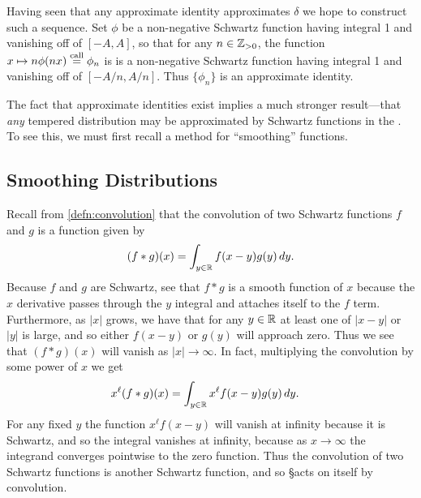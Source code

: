     Having seen that any approximate identity approximates $\delta$ we hope to construct such a sequence.
    Set $\phi$ be a non-negative Schwartz function having integral 1 and vanishing off of $[-A,A]$, so that for any $n\in\mathbb{Z}_{>0}$, the function $x\mapsto n\phi(nx) \overset{\text{call}}{=} \phi_n$ is is a non-negative Schwartz function having integral 1 and vanishing off of $[-A/n,A/n]$.
    Thus $\{\phi_n\}$ is an approximate identity.

    The fact that approximate identities exist implies a much stronger result---that \emph{any} tempered distribution may be approximated by Schwartz functions in the \ws.
    To see this, we must first recall a method for ``smoothing'' functions.

  \subsection{Smoothing Distributions}
    Recall from \cref{defn:convolution} that the convolution of two Schwartz functions $f$ and $g$ is a function given by
    \begin{align*}
      (f*g)(x) = \int_{y\in\mathbb{R}} f(x-y)g(y)\,dy \text{.}
    \end{align*}
    Because $f$ and $g$ are Schwartz, see that $f*g$ is a smooth function of $x$ because the $x$ derivative passes through the $y$ integral and attaches itself to the $f$ term.
    Furthermore, as $|x|$ grows, we have that for any $y\in\mathbb{R}$ at least one of $|x-y|$ or $|y|$ is large, and so either $f(x-y)$ or $g(y)$ will approach zero.
    Thus we see that $(f*g)(x)$ will vanish as $|x|\rightarrow\infty$.
    In fact, multiplying the convolution by some power of $x$ we get
    \begin{align*}
      x^\ell(f*g)(x)
      &= \int_{y\in\mathbb{R}} x^\ell f(x-y)g(y)\,dy \text{.}
    \end{align*}
    For any fixed $y$ the function $x^\ell f(x-y)$ will vanish at infinity because it is Schwartz, and so the integral vanishes at infinity, because as $x\rightarrow\infty$ the integrand converges pointwise to the zero function.
    Thus the convolution of two Schwartz functions is another Schwartz function, and so \S acts on itself by convolution.

